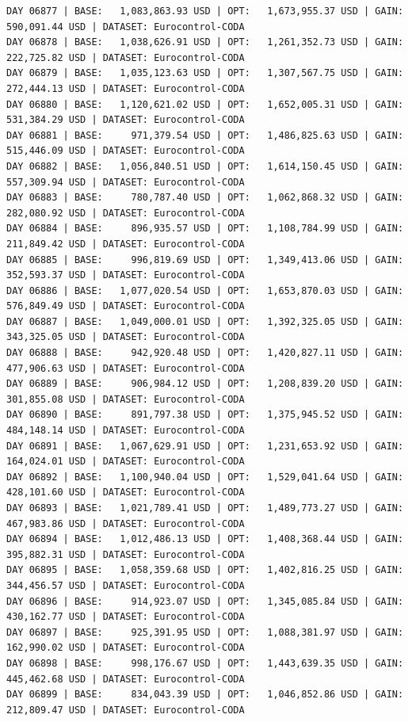 \documentclass[11pt,a4paper]{article}
\begin{document}
\begin{verbatim}
DAY 06877 | BASE:   1,083,863.93 USD | OPT:   1,673,955.37 USD | GAIN: 590,091.44 USD | DATASET: Eurocontrol-CODA
DAY 06878 | BASE:   1,038,626.91 USD | OPT:   1,261,352.73 USD | GAIN: 222,725.82 USD | DATASET: Eurocontrol-CODA
DAY 06879 | BASE:   1,035,123.63 USD | OPT:   1,307,567.75 USD | GAIN: 272,444.13 USD | DATASET: Eurocontrol-CODA
DAY 06880 | BASE:   1,120,621.02 USD | OPT:   1,652,005.31 USD | GAIN: 531,384.29 USD | DATASET: Eurocontrol-CODA
DAY 06881 | BASE:     971,379.54 USD | OPT:   1,486,825.63 USD | GAIN: 515,446.09 USD | DATASET: Eurocontrol-CODA
DAY 06882 | BASE:   1,056,840.51 USD | OPT:   1,614,150.45 USD | GAIN: 557,309.94 USD | DATASET: Eurocontrol-CODA
DAY 06883 | BASE:     780,787.40 USD | OPT:   1,062,868.32 USD | GAIN: 282,080.92 USD | DATASET: Eurocontrol-CODA
DAY 06884 | BASE:     896,935.57 USD | OPT:   1,108,784.99 USD | GAIN: 211,849.42 USD | DATASET: Eurocontrol-CODA
DAY 06885 | BASE:     996,819.69 USD | OPT:   1,349,413.06 USD | GAIN: 352,593.37 USD | DATASET: Eurocontrol-CODA
DAY 06886 | BASE:   1,077,020.54 USD | OPT:   1,653,870.03 USD | GAIN: 576,849.49 USD | DATASET: Eurocontrol-CODA
DAY 06887 | BASE:   1,049,000.01 USD | OPT:   1,392,325.05 USD | GAIN: 343,325.05 USD | DATASET: Eurocontrol-CODA
DAY 06888 | BASE:     942,920.48 USD | OPT:   1,420,827.11 USD | GAIN: 477,906.63 USD | DATASET: Eurocontrol-CODA
DAY 06889 | BASE:     906,984.12 USD | OPT:   1,208,839.20 USD | GAIN: 301,855.08 USD | DATASET: Eurocontrol-CODA
DAY 06890 | BASE:     891,797.38 USD | OPT:   1,375,945.52 USD | GAIN: 484,148.14 USD | DATASET: Eurocontrol-CODA
DAY 06891 | BASE:   1,067,629.91 USD | OPT:   1,231,653.92 USD | GAIN: 164,024.01 USD | DATASET: Eurocontrol-CODA
DAY 06892 | BASE:   1,100,940.04 USD | OPT:   1,529,041.64 USD | GAIN: 428,101.60 USD | DATASET: Eurocontrol-CODA
DAY 06893 | BASE:   1,021,789.41 USD | OPT:   1,489,773.27 USD | GAIN: 467,983.86 USD | DATASET: Eurocontrol-CODA
DAY 06894 | BASE:   1,012,486.13 USD | OPT:   1,408,368.44 USD | GAIN: 395,882.31 USD | DATASET: Eurocontrol-CODA
DAY 06895 | BASE:   1,058,359.68 USD | OPT:   1,402,816.25 USD | GAIN: 344,456.57 USD | DATASET: Eurocontrol-CODA
DAY 06896 | BASE:     914,923.07 USD | OPT:   1,345,085.84 USD | GAIN: 430,162.77 USD | DATASET: Eurocontrol-CODA
DAY 06897 | BASE:     925,391.95 USD | OPT:   1,088,381.97 USD | GAIN: 162,990.02 USD | DATASET: Eurocontrol-CODA
DAY 06898 | BASE:     998,176.67 USD | OPT:   1,443,639.35 USD | GAIN: 445,462.68 USD | DATASET: Eurocontrol-CODA
DAY 06899 | BASE:     834,043.39 USD | OPT:   1,046,852.86 USD | GAIN: 212,809.47 USD | DATASET: Eurocontrol-CODA

\end{verbatim}
\end{document}
